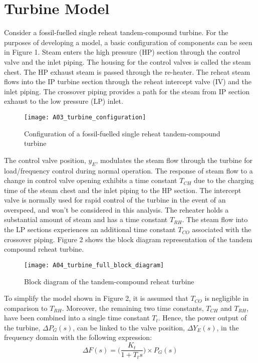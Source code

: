 \section{Turbine Model}\label{app:turbine_model}
Consider a fossil-fuelled single reheat tandem-compound turbine. For the purposes of developing a model, a basic configuration of components can be seen in Figure 1. Steam enters the high pressure (HP) section through the control valve and the inlet piping. The housing for the control valves is called the steam chest. The HP exhaust steam is passed through the re-heater. The reheat steam flows into the IP turbine section through the reheat intercept valve (IV) and the inlet piping. The crossover piping provides a path for the steam from IP section exhaust to the low pressure (LP) inlet.

\begin{figure}
	\centering
	\texttt{[image: A03\_turbine\_configuration]}
	\caption[Reheat tandem-compound turbine configuration]{Configuration of a fossil-fuelled single reheat tandem-compound turbine}
	\label{fig:A03_turbine_configuration}
\end{figure}

The control valve position, $y_E$, modulates the steam flow through the turbine for load/frequency control during normal operation. The response of steam flow to a change in control valve opening exhibits a time constant $T_{CH}$ due to the charging time of the steam chest and the inlet piping to the HP section. The intercept valve is normally used for rapid control of the turbine in the event of an overspeed, and won't be considered in this analysis. The reheater holds a substantial amount of steam and has a time constant $T_{RH}$. The steam flow into the LP sections experiences an additional time constant $T_{CO}$ associated with the crossover piping. Figure 2 shows the block diagram representation of the tandem compound reheat turbine.

\begin{figure}
	\centering
	\texttt{[image: A04\_turbine\_full\_block\_diagram]}
	\caption[Tandem-compound reheat turbine model]{Block diagram of the tandem-compound reheat turbine}
	\label{fig:A04_turbine_full_block_diagram}
\end{figure}

To simplify the model shown in Figure 2, it is assumed that $T_{CO}$ is negligible in comparison to $T_{RH}$. Moreover, the remaining two time constants, $T_{CH}$ and $T_{RH}$, have been combined into a single time constant $T_t$. Hence, the power output of the turbine, $\Delta P_G(s)$, can be linked to the valve position, $\Delta Y_E(s)$, in the frequency domain with the following expression:
\begin{equation}
	\Delta F(s) = \bigg( \frac{K_t}{1 + T_t s} \bigg) \times P_G(s) \label{eq:A10}
\end{equation}

